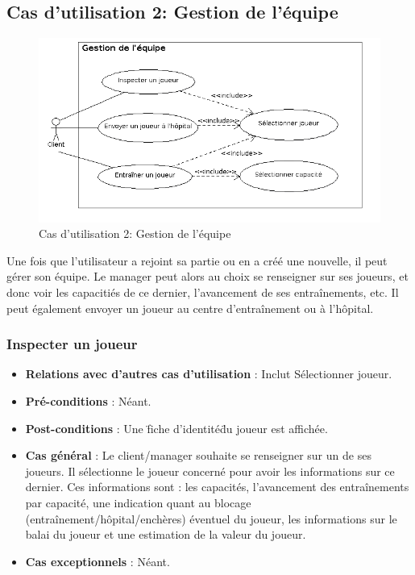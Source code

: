 \documentclass[a4paper,titlepage]{scrreprt}
\begin{document}
  \subsection{Cas d'utilisation 2: Gestion de l'équipe}
  \begin{figure}[H]
    \center
    \includegraphics[scale=0.5]{uml/useCaseView/GestionEquipe.png}
    \caption{Cas d'utilisation 2: Gestion de l'équipe}
  \end{figure}  
    Une fois que l'utilisateur a rejoint sa \gls{partie} ou en a créé une nouvelle, il peut gérer son équipe. Le manager peut alors au choix se renseigner sur ses joueurs, et donc voir les capacitiés de ce dernier, l'avancement de ses entraînements, etc. Il peut également envoyer un joueur au centre d'entraînement ou à l'hôpital.

    \subsubsection{Inspecter un joueur}
      \begin{itemize}
        \item \textbf{Relations avec d'autres cas d'utilisation}  : Inclut Sélectionner joueur.
        \item \textbf{Pré-conditions} : Néant.
        \item \textbf{Post-conditions} : Une \"fiche d'identité\" du joueur est affichée.
        \item \textbf{Cas général} : Le client/manager souhaite se renseigner sur un de ses joueurs. Il sélectionne le joueur concerné pour avoir les informations sur ce dernier. Ces informations sont : les capacités, l'avancement des entraînements par capacité, une indication quant au blocage (entraînement/hôpital/enchères) éventuel du joueur, les informations sur le balai du joueur et une estimation de la valeur du joueur.
        \item \textbf{Cas exceptionnels} : Néant.
      \end{itemize}
\end{document}

